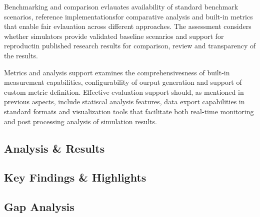 Benchmarking and comparison evlauates availability of standard benchmark scenarios, reference implementationsfor comparative analysis and built-in metrics that enable fair evlauation across different approaches.
The assessment considers whether simulators provide validated baseline scenarios and support for reproductin published research results for comparison, review and transparency of the results.

Metrics and analysis support examines the comprehensivesness of built-in measurement capabilities, configurability of ourput generation and support of custom metric definition.
Effective evaluation support should, as mentioned in previous aspects, include statiscal analysis features, data export capabilities in standard formats and visualization tools that facilitate both real-time monitoring and post processing analysis of simulation results. 

\subsection{Analysis \& Results}
\subsection{Key Findings \& Highlights}
\subsection{Gap Analysis}
